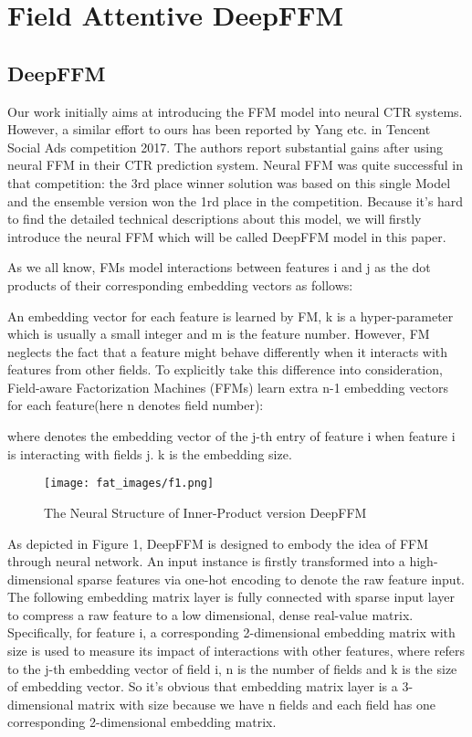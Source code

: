 \documentclass{article}
\begin{document}
\section{Field Attentive DeepFFM}
\subsection{DeepFFM}
Our work initially aims at introducing the FFM model into neural CTR systems. However, a similar effort to ours has been reported by Yang etc. \cite{yang2017} in Tencent Social Ads competition 2017. The authors report substantial gains after using neural FFM in their CTR prediction system. Neural FFM was quite successful in that competition: the 3rd place winner solution was based on this single Model and the ensemble version won the 1rd place in the competition. Because it's hard to find the detailed technical descriptions about this model, we will firstly introduce the neural FFM which will be called DeepFFM model in this paper. 

As we all know, FMs\cite{rendle2010factorization} model interactions between features i and j as the dot products of their corresponding embedding vectors as follows: 

An embedding vector  for each feature is learned by FM, k is a hyper-parameter which is usually a small integer and m is the feature number. However, FM neglects the fact that a feature might behave differently when it interacts with features from other fields. To explicitly take this difference into consideration, Field-aware Factorization Machines (FFMs) learn extra n-1 embedding vectors for each feature(here n denotes field number):


\noindent where  denotes the embedding vector of the j-th entry of feature i when feature i is interacting with fields j. k is the embedding size.

\begin{figure}[hbt!]
\texttt{[image: fat\_images/f1.png]}
\caption{The Neural Structure of Inner-Product version DeepFFM}
\label{fig:f1}
\end{figure}


As depicted in Figure 1, DeepFFM is designed to embody the idea of FFM through neural network. An input instance is firstly transformed into a high-dimensional sparse features via one-hot encoding to denote the raw feature input. The following embedding matrix layer is fully connected with sparse input layer to compress a raw feature to a low dimensional, dense real-value matrix. Specifically, for feature i, a corresponding 2-dimensional embedding matrix    with size  is used to measure its impact of interactions with other features, where  refers to the j-th embedding vector of field i, n is the number of fields and k is the size of embedding vector. So it's obvious that embedding matrix layer  is a 3-dimensional matrix with size   because we have n fields and each field has one corresponding 2-dimensional embedding matrix.
\end{document}
